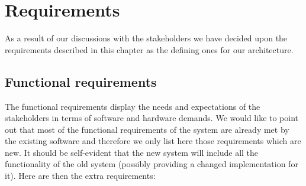 \chapter{Requirements}

As a result of our discussions with the stakeholders we have decided
upon the requirements described in this chapter as the defining ones
for our architecture.

\section{Functional requirements}
The functional requirements display the needs and expectations of
the stakeholders in terms of software and hardware demands. We
would like to point out that most of the functional requirements of
the system are already met by the existing software and therefore
we only list here those requirements which are new. It should be
self-evident that the new system will include all the functionality
of the old system (possibly providing a changed implementation for
it). Here are then the extra requirements:
